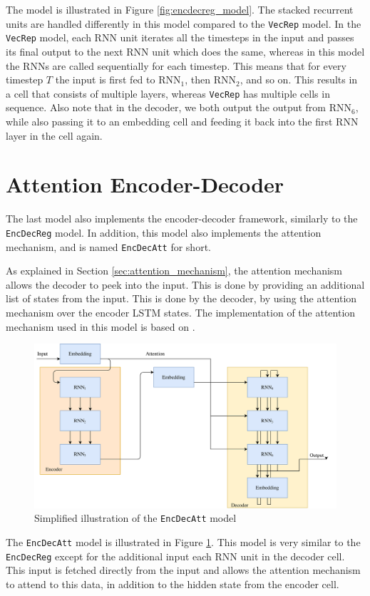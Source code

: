 The model is illustrated in Figure \ref{fig:encdecreg_model}. The stacked recurrent units are handled differently in this model compared to the {\tt VecRep} model. In the {\tt VecRep} model, each RNN unit iterates all the timesteps in the input and passes its final output to the next RNN unit which does the same, whereas in this model the RNNs are called sequentially for each timestep. This means that for every timestep \(T\) the input is first fed to \(\text{RNN}_1\), then \(\text{RNN}_2\), and so on. This results in a cell that consists of multiple layers, whereas {\tt VecRep} has multiple cells in sequence. Also note that in the decoder, we both output the output from \(\text{RNN}_6\), while also passing it to an embedding cell and feeding it back into the first RNN layer in the cell again.


\section{Attention Encoder-Decoder}
\label{sec:attention_encoder_decoder}
The last model also implements the encoder-decoder framework, similarly to the {\tt EncDecReg} model. In addition, this model also implements the attention mechanism, and is named {\tt EncDecAtt} for short.

As explained in Section \ref{sec:attention_mechanism}, the attention mechanism allows the decoder to peek into the input. This is done by providing an additional list of states from the input. This is done by the decoder, by using the attention mechanism over the encoder LSTM states. The implementation of the attention mechanism used in this model is based on \citep{vinyals2015grammar}.

\begin{figure}[!ht]
    \centering
    \includegraphics[width=1\textwidth]{fig/models/encdecatt_model.png}
    \caption{Simplified illustration of the {\tt EncDecAtt} model}
    \label{fig:encdecattg_model}
\end{figure}

The {\tt EncDecAtt} model is illustrated in Figure \ref{fig:encdecattg_model}. This model is very similar to the {\tt EncDecReg} except for the additional input each RNN unit in the decoder cell. This input is fetched directly from the input and allows the attention mechanism to attend to this data, in addition to the hidden state from the encoder cell.